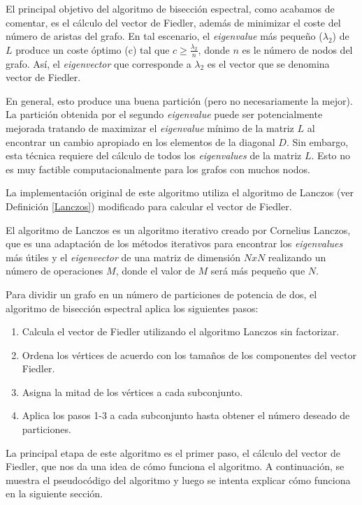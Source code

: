 El principal objetivo del algoritmo de bisección espectral, como acabamos de comentar, es el cálculo del vector de Fiedler, además de minimizar el coste del número de aristas del grafo. En tal escenario, el \textit{eigenvalue} más pequeño ($\lambda_{2}$) de $L$ produce un coste óptimo (c) tal que $c \geqslant \frac{\lambda_{2}}{n}$, donde $n$ es le número de nodos del grafo. Así, el \textit{eigenvector} que corresponde a $\lambda_{2}$ es el vector que se denomina vector de Fiedler. 

En general, esto produce una buena partición (pero no necesariamente la mejor). La partición obtenida por el segundo \textit{eigenvalue} puede ser potencialmente mejorada tratando de maximizar el \textit{eigenvalue} mínimo de la matriz $L$ al encontrar un cambio apropiado en los elementos de la diagonal $D$. Sin embargo, esta técnica requiere del cálculo de todos los \textit{eigenvalues} de la matriz $L$. Esto no es muy factible computacionalmente para los grafos con muchos nodos.

La implementación original de este algoritmo utiliza el algoritmo de Lanczos (ver Definición \ref{Lanczos}) modificado para calcular el vector de Fiedler. 

\begin{mydef}\label{Lanczos}
	El algoritmo de Lanczos\cite{Lanczos} es un algoritmo iterativo creado por Cornelius Lanczos, que es una adaptación de los métodos iterativos para encontrar los \textit{eigenvalues} más útiles y el \textit{eigenvector} de una matriz de dimensión $N x N$ realizando un número de operaciones $M$, donde el valor de $M$ será más pequeño que $N$. 
\end{mydef}

Para dividir un grafo en un número de particiones de potencia de dos, el algoritmo de bisección espectral aplica los siguientes pasos:

\begin{enumerate}
	\item Calcula el vector de Fiedler utilizando el algoritmo Lanczos sin factorizar.
	\item Ordena los vértices de acuerdo con los tamaños de los componentes del vector Fiedler.
	\item Asigna la mitad de los vértices a cada subconjunto.
	\item Aplica los pasos 1-3 a cada subconjunto hasta obtener el número deseado de particiones.
\end{enumerate}

La principal etapa de este algoritmo es el primer paso, el cálculo del vector de Fiedler, que nos da una idea de cómo funciona el algoritmo. A continuación, se muestra el pseudocódigo del algoritmo y luego se intenta explicar cómo funciona en la siguiente sección.


